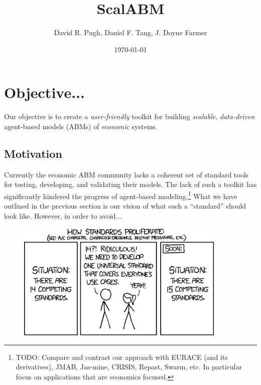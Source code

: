 \documentclass[11pt]{amsart}
\title{ScalABM}
\author{David R. Pugh, Daniel F. Tang, J. Doyne Farmer}
\date{\today}
\begin{document}
\maketitle

\section{Objective...}
Our objective is to create a \textit{user-friendly} toolkit for building \textit{scalable}, \textit{data-driven} agent-based models (ABMs) of \textit{economic} systems.

\subsection{Motivation}
Currently the economic ABM community lacks a coherent set of standard tools for testing, developing, and validating their models. The lack of such a toolkit has significantly hindered the progress of agent-based modeling.\footnote{
%
TODO: Compare and contrast our approach with EURACE (and its derivatives), JMAB, Jas-mine, CRISIS, Repast, Swarm, etc.  In particular focus on applications that are economics focused.
%
} 
What we have outlined in the previous section is our vision of what such a ``standard'' should look like. However, in order to avoid...

\begin{figure}[H]
\centering
\includegraphics[width=10cm]{standards.png}
\end{figure}
\end{document}
